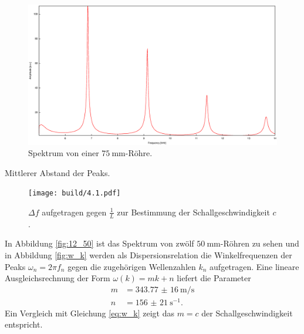 \begin{figure}
\centering
\includegraphics[width=\linewidth-60pt,height=\textheight-60pt,keepaspectratio]{FP-V23data/4.1_75mm.eps}
\caption{Spektrum von einer $\SI{75}{\milli\meter}$-Röhre.}
\label{fig:Spek4_1}
\end{figure}

\begin{table}
\caption{Mittlerer Abstand der Peaks.}
\centering

\label{tab:mu}
\end{table}

\begin{figure}
\centering
\texttt{[image: build/4.1.pdf]}
\caption{$\Delta f$ aufgetragen gegen $\frac{1}{L}$ zur Bestimmung der Schallgeschwindigkeit $c$.}
\label{fig:Df_L}
\end{figure}

\newpage
\noindent In Abbildung \ref{fig:12_50} ist das Spektrum von zwölf $\SI{50}{\milli\meter}$-Röhren zu sehen und in Abbildung \ref{fig:w_k} werden als Dispersionsrelation die Winkelfrequenzen der Peaks $\omega_n=2\pi f_n$ gegen die zugehörigen Wellenzahlen $k_n$ aufgetragen. Eine lineare Ausgleichsrechnung der Form $\omega(k)=m k + n$ liefert die Parameter
\begin{align*}
m&=\SI{343,77(16)}{\meter\per\second}\\
n&=\SI{156(21)}{\second^{-1}}\text{.}
\end{align*}
Ein Vergleich mit Gleichung \eqref{eq:w_k} zeigt das $m=c$ der Schallgeschwindigkeit entspricht.\\

